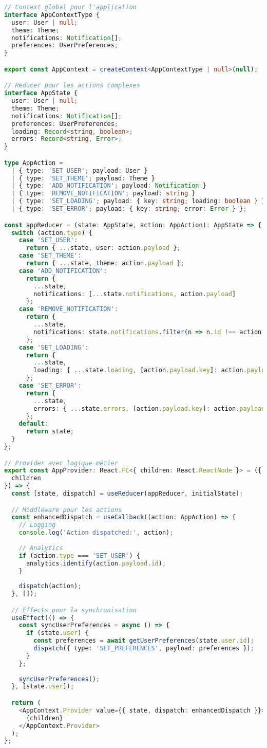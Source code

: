 \documentclass[12pt,a4paper]{report}
\begin{document}
\begin{lstlisting}[language=TypeScript, caption=Gestion d'état avec Context et Reducers]
// Context global pour l'application
interface AppContextType {
  user: User | null;
  theme: Theme;
  notifications: Notification[];
  preferences: UserPreferences;
}

export const AppContext = createContext<AppContextType | null>(null);

// Reducer pour les actions complexes
interface AppState {
  user: User | null;
  theme: Theme;
  notifications: Notification[];
  preferences: UserPreferences;
  loading: Record<string, boolean>;
  errors: Record<string, Error>;
}

type AppAction = 
  | { type: 'SET_USER'; payload: User }
  | { type: 'SET_THEME'; payload: Theme }
  | { type: 'ADD_NOTIFICATION'; payload: Notification }
  | { type: 'REMOVE_NOTIFICATION'; payload: string }
  | { type: 'SET_LOADING'; payload: { key: string; loading: boolean } }
  | { type: 'SET_ERROR'; payload: { key: string; error: Error } };

const appReducer = (state: AppState, action: AppAction): AppState => {
  switch (action.type) {
    case 'SET_USER':
      return { ...state, user: action.payload };
    case 'SET_THEME':
      return { ...state, theme: action.payload };
    case 'ADD_NOTIFICATION':
      return { 
        ...state, 
        notifications: [...state.notifications, action.payload] 
      };
    case 'REMOVE_NOTIFICATION':
      return {
        ...state,
        notifications: state.notifications.filter(n => n.id !== action.payload)
      };
    case 'SET_LOADING':
      return {
        ...state,
        loading: { ...state.loading, [action.payload.key]: action.payload.loading }
      };
    case 'SET_ERROR':
      return {
        ...state,
        errors: { ...state.errors, [action.payload.key]: action.payload.error }
      };
    default:
      return state;
  }
};

// Provider avec logique métier
export const AppProvider: React.FC<{ children: React.ReactNode }> = ({ 
  children 
}) => {
  const [state, dispatch] = useReducer(appReducer, initialState);

  // Middleware pour les actions
  const enhancedDispatch = useCallback((action: AppAction) => {
    // Logging
    console.log('Action dispatched:', action);
    
    // Analytics
    if (action.type === 'SET_USER') {
      analytics.identify(action.payload.id);
    }
    
    dispatch(action);
  }, []);

  // Effects pour la synchronisation
  useEffect(() => {
    const syncUserPreferences = async () => {
      if (state.user) {
        const preferences = await getUserPreferences(state.user.id);
        dispatch({ type: 'SET_PREFERENCES', payload: preferences });
      }
    };
    
    syncUserPreferences();
  }, [state.user]);

  return (
    <AppContext.Provider value={{ state, dispatch: enhancedDispatch }}>
      {children}
    </AppContext.Provider>
  );
};
\end{lstlisting}
\end{document}
